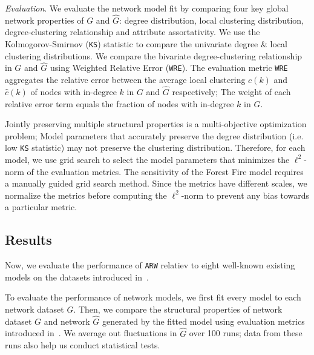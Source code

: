 \textit{Evaluation}.
We evaluate
the network model fit by comparing four key global network properties of ${G}$ and $\hat{G}$:
degree distribution, local clustering distribution, degree-clustering relationship
and attribute assortativity.
We use the Kolmogorov-Smirnov (\texttt{KS}) statistic to compare the univariate degree
\& local clustering distributions.
We compare the bivariate degree-clustering relationship in $G$ and $\hat{G}$ using
Weighted Relative Error (\texttt{WRE}). The evaluation metric \texttt{WRE} aggregates the relative error
between the average local clustering $c(k)$ and $\hat{c}(k)$ of nodes  with in-degree $k$
in $G$ and $\hat{G}$ respectively; The weight of each relative error term equals the fraction
of nodes with in-degree $k$ in $G$.

Jointly preserving multiple structural properties is a multi-objective optimization
problem; Model parameters that accurately preserve the degree distribution
(i.e. low \texttt{KS} statistic) may not preserve the clustering distribution.
Therefore, for each model, we use grid search to select the model parameters
that minimizes the $\ell^2$-norm of the evaluation metrics. The sensitivity of the
Forest Fire model requires a manually guided grid search method. Since the metrics have
different scales, we normalize the metrics before computing the $\ell^2$-norm
to prevent any bias towards a particular metric.

\subsection{Results}
\label{sub:Experimental Results}

Now, we evaluate the performance of \texttt{ARW} relatiev to eight well-known
existing models on the datasets introduced in~.

To evaluate the performance of network models, we first fit every model
to each network dataset $G$. Then, we compare the structural properties of
network dataset $G$ and network $\hat{G}$ generated by the fitted model using
evaluation metrics introduced in~. We average out
fluctuations in $\hat{G}$ over 100 runs; data from these runs also help us conduct statistical tests.

